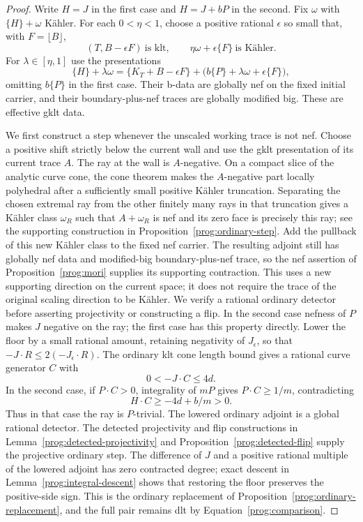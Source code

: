 \begin{proof}
Write \(H=J\) in the first case and \(H=J+bP\) in the second.
Fix \(\omega\) with \(\{H\}+\omega\) Kähler. For each
\(0<\eta<1\), choose a positive rational \(\epsilon\) so small that,
with \(F=\lfloor B\rfloor\),
\[
 (T,B-\epsilon F)\ \text{is klt},\qquad
 \eta\omega+\epsilon\{F\}\ \text{is Kähler}.
\]
For \(\lambda\in[\eta,1]\) use the presentations
\[
 \{H\}+\lambda\omega
  =\{K_T+B-\epsilon F\}
    +\bigl(b\{P\}+\lambda\omega+\epsilon\{F\}\bigr),
\]
omitting \(b\{P\}\) in the first case. Their b-data are globally
nef on the fixed initial carrier, and their boundary-plus-nef traces
are globally modified big. These are effective gklt data.

We first construct a step whenever the unscaled working trace is not
nef. Choose a positive shift strictly below the current wall and use the
gklt presentation of its current trace \(A\). The ray at the wall is
\(A\)-negative. On a compact slice of the analytic curve cone, the
cone theorem makes the \(A\)-negative part locally polyhedral after
a sufficiently small positive Kähler truncation. Separating the
chosen extremal ray from the other finitely many rays in that
truncation gives a Kähler class \(\omega_R\) such that
\(A+\omega_R\) is nef and its zero face is precisely this ray;
see the supporting construction in Proposition~\ref{prog:ordinary-step}.
Add the pullback of this new Kähler class to the fixed nef carrier.
The resulting adjoint still has globally nef data and modified-big
boundary-plus-nef trace, so the nef assertion of
Proposition~\ref{prog:mori} supplies its supporting contraction.
This uses a new supporting direction on the current space; it does
not require the trace of the original scaling direction to be Kähler.
We verify a rational ordinary detector before asserting projectivity
or constructing a flip.
In the second case nefness of \(P\) makes \(J\) negative on the ray;
the first case has this property directly. Lower the floor by a small
rational amount, retaining negativity of \(J_\epsilon\), so that
\(-J\cdot R\leq2(-J_\epsilon\cdot R)\). The ordinary klt cone
length bound gives a rational curve generator \(C\) with
\[
                         0<-J\cdot C\leq4d.
\]
In the second case, if \(P\cdot C>0\), integrality of \(mP\) gives
\(P\cdot C\geq1/m\), contradicting
\[
                         H\cdot C\geq-4d+b/m>0.
\]
Thus in that case the ray is \(P\)-trivial. The lowered ordinary adjoint is a
global rational detector. The detected projectivity and flip
constructions in Lemma~\ref{prog:detected-projectivity}
and Proposition~\ref{prog:detected-flip} supply the projective ordinary step.
The difference of \(J\) and a positive rational multiple of the
lowered adjoint has zero contracted degree; exact descent in
Lemma~\ref{prog:integral-descent} shows that restoring the floor
preserves the positive-side sign. This is the ordinary replacement
of Proposition~\ref{prog:ordinary-replacement}, and the full pair
remains dlt by Equation~\eqref{prog:comparison}.


\end{proof}
